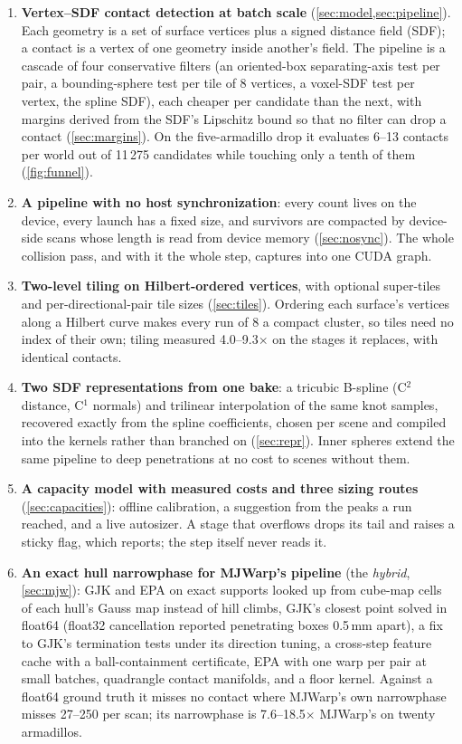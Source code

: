 \begin{enumerate}
\item \textbf{Vertex--SDF contact detection at batch scale} (\cref{sec:model,sec:pipeline}). Each geometry is a set of surface vertices plus a signed distance field (SDF); a contact is a vertex of one geometry inside another's field. The pipeline is a cascade of four conservative filters (an oriented-box separating-axis test per pair, a bounding-sphere test per tile of 8 vertices, a voxel-SDF test per vertex, the spline SDF), each cheaper per candidate than the next, with margins derived from the SDF's Lipschitz bound so that no filter can drop a contact (\cref{sec:margins}). On the five-armadillo drop it evaluates 6--13 contacts per world out of 11\,275 candidates while touching only a tenth of them (\cref{fig:funnel}).
\item \textbf{A pipeline with no host synchronization}: every count lives on the device, every launch has a fixed size, and survivors are compacted by device-side scans whose length is read from device memory (\cref{sec:nosync}). The whole collision pass, and with it the whole step, captures into one CUDA graph.
\item \textbf{Two-level tiling on Hilbert-ordered vertices}, with optional super-tiles and per-directional-pair tile sizes (\cref{sec:tiles}). Ordering each surface's vertices along a Hilbert curve makes every run of 8 a compact cluster, so tiles need no index of their own; tiling measured 4.0--9.3$\times$ on the stages it replaces, with identical contacts.
\item \textbf{Two SDF representations from one bake}: a tricubic B-spline (C$^2$ distance, C$^1$ normals) and trilinear interpolation of the same knot samples, recovered exactly from the spline coefficients, chosen per scene and compiled into the kernels rather than branched on (\cref{sec:repr}). Inner spheres extend the same pipeline to deep penetrations at no cost to scenes without them.
\item \textbf{A capacity model with measured costs and three sizing routes} (\cref{sec:capacities}): offline calibration, a suggestion from the peaks a run reached, and a live autosizer. A stage that overflows drops its tail and raises a sticky flag, which  reports; the step itself never reads it.
\item \textbf{An exact hull narrowphase for MJWarp's pipeline} (the \emph{hybrid}, \cref{sec:mjw}): GJK and EPA \cite{gjk,epa} on exact supports looked up from cube-map cells of each hull's Gauss map instead of hill climbs, GJK's closest point solved in float64 (float32 cancellation reported penetrating boxes 0.5\,mm apart), a fix to GJK's termination tests under its direction tuning, a cross-step feature cache with a ball-containment certificate, EPA with one warp per pair at small batches, quadrangle contact manifolds, and a floor kernel. Against a float64 ground truth it misses no contact where MJWarp's own narrowphase misses 27--250 per scan; its narrowphase is 7.6--18.5$\times$ MJWarp's on twenty armadillos.

\end{enumerate}
